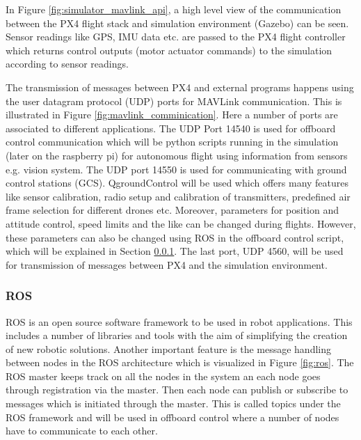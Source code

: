 \documentclass[../Head/report.tex]{subfiles}
\begin{document}
In Figure \ref{fig:simulator_mavlink_api}, a high level view of the communication between the PX4 flight stack and simulation environment (Gazebo) can be seen. Sensor readings like GPS, IMU data etc. are passed to the PX4 flight controller which returns control outputs (motor actuator commands) to the simulation according to sensor readings. 

The transmission of messages between PX4 and external programs happens using  the user datagram protocol (UDP) ports for MAVLink communication. This is illustrated in Figure \ref{fig:mavlink_comminication}. Here a number of ports are associated to different applications. The UDP Port 14540 is used for offboard control communication which will be python scripts running in the simulation (later on the raspberry pi) for autonomous flight using information from sensors e.g. vision system. The UDP port 14550 is used for communicating with ground control stations (GCS). QgroundControl will be used which offers many features like sensor calibration, radio setup and calibration of transmitters, predefined air frame selection for different drones etc. Moreover, parameters for position and attitude control, speed limits and the like can be changed during flights. However, these parameters can also be changed using ROS in the offboard control script, which will be explained in Section \ref{sec:ros}. The last port, UDP 4560, will be used for transmission of messages between PX4 and the simulation environment.


\subsubsection{ROS}
\label{sec:ros}

ROS is an open source software framework to be used in robot applications. This includes a number of libraries and tools with the aim of simplifying the creation of new robotic solutions. Another important feature is the message handling between nodes in the ROS architecture which is visualized in Figure \ref{fig:ros}. The ROS master keeps track on all the nodes in the system an each node goes through registration via the master. Then each node can publish or subscribe to messages which is initiated through the master. This is called topics under the ROS framework and will be used in offboard control where a number of nodes have to communicate to each other.  
\end{document}
